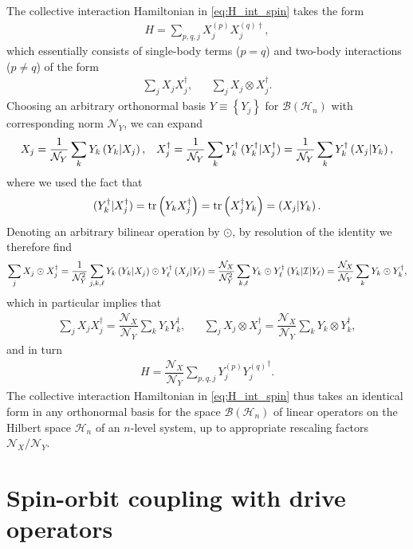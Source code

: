 \documentclass[nofootinbib,notitlepage,11pt]{revtex4-2}
\newcommand{\f}[2]{\dfrac{#1}{#2}} %
\newcommand{\p}[1]{\left(#1\right)} %
\renewcommand{\set}[1]{\left\{#1\right\}} %
\newcommand{\1}{\mathds{1}}
\newcommand{\B}{\mathcal{B}}
\renewcommand{\H}{\mathcal{H}}
\newcommand{\I}{\mathcal{I}}
\newcommand{\N}{\mathcal{N}}
\def\obk#1{\mathinner{({#1})}}
\begin{document}
The collective interaction Hamiltonian in \eqref{eq:H_int_spin} takes
the form
\begin{align}
  H = \sum_{p,q,j} X_j^{(p)} X_j^{(q)\dag},
\end{align}
which essentially consists of single-body terms ($p=q$) and two-body
interactions ($p\ne q$) of the form
\begin{align}
  \sum_j X_j X_j^\dag,
  &&
  \sum_j X_j \otimes X_j^\dag.
\end{align}
Choosing an arbitrary orthonormal basis $Y\equiv\set{Y_j}$ for
$\B\p{\H_n}$ with corresponding norm $\N_Y$, we can expand
\begin{align}
  X_j = \f1{\N_Y} \sum_k Y_k \obk{Y_k|X_j},
  &&
  X_j^\dag = \f1{\N_Y} \sum_k Y_k^\dag \obk{Y_k^\dag|X_j^\dag}
  = \f1{\N_Y} \sum_k Y_k^\dag \obk{X_j|Y_k},
\end{align}
where we used the fact that
\begin{align}
  \obk{Y_k^\dag|X_j^\dag}
  = \tr\p{Y_k X_j^\dag}
  = \tr\p{X_j^\dag Y_k}
  = \obk{X_j|Y_k}.
\end{align}
Denoting an arbitrary bilinear operation by $\odot$, by resolution of
the identity we therefore find
\begin{align}
  \sum_j X_j \odot X_j^\dag
  = \f1{\N_Y^2} \sum_{j,k,\ell} Y_k \obk{Y_k|X_j}
  \odot Y_\ell^\dag \obk{X_j|Y_\ell}
  = \f{\N_X}{\N_Y^2} \sum_{k,\ell} Y_k \odot Y_\ell^\dag
  \obk{Y_k|\I|Y_\ell}
  = \f{\N_X}{\N_Y} \sum_k Y_k \odot Y_k^\dag,
\end{align}
which in particular implies that
\begin{align}
  \sum_j X_j X_j^\dag
  = \f{\N_X}{\N_Y} \sum_k Y_k Y_k^\dag,
  &&
  \sum_j X_j \otimes X_j^\dag
  = \f{\N_X}{\N_Y} \sum_k Y_k \otimes Y_k^\dag,
\end{align}
and in turn
\begin{align}
  H = \f{\N_X}{\N_Y} \sum_{p,q,j} Y_j^{(p)} {Y_j^{(q)}}^\dag.
\end{align}
The collective interaction Hamiltonian in \eqref{eq:H_int_spin} thus
takes an identical form in any orthonormal basis for the space
$\B\p{\H_n}$ of linear operators on the Hilbert space $\H_n$ of an
$n$-level system, up to appropriate rescaling factors $\N_X/\N_Y$.

\section{Spin-orbit coupling with drive operators}
\label{sec:lat_drive}
\end{document}
